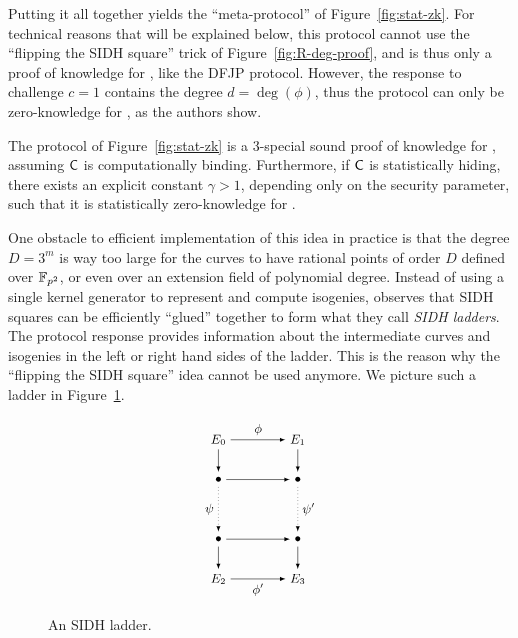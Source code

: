 Putting it all together yields the ``meta-protocol'' of
Figure~\ref{fig:stat-zk}. For technical reasons that will be explained below, this protocol cannot use the ``flipping the SIDH square''
trick of Figure~\ref{fig:R-deg-proof}, and is thus only a proof of
knowledge for \R[isog], like the DFJP protocol.  However, the response
to challenge $c=1$ contains the degree $d=\deg(\phi)$, thus the
protocol can only be zero-knowledge for \R[deg], as the authors show.

\begin{proposition}
  The protocol of Figure~\ref{fig:stat-zk} is a 3-special sound proof
  of knowledge for \R[isog], assuming $\mathsf{C}$ is computationally
  binding.  Furthermore, if $\mathsf{C}$ is statistically hiding, there
  exists an explicit constant $\gamma>1$, depending only on the
  security parameter, such that it is statistically zero-knowledge for
  \R[deg].
\end{proposition}

One obstacle to efficient implementation of this idea in practice is that the
degree $D=3^m$ is way too large for the curves to have rational points
of order $D$ defined over $\mathbb{F}_{p^2}$, or even over an extension field
of polynomial degree.  Instead of using a single kernel generator to
represent and compute isogenies, \cite{cryptoeprint:2022/1469} observes that SIDH squares
can be efficiently ``glued'' together to form what they call
\emph{SIDH ladders}.
The protocol response provides information about the intermediate curves and isogenies in the left or right hand sides of the ladder.
This is the reason why the ``flipping the SIDH square'' idea cannot be used anymore.
We picture such a ladder in Figure~\ref{fig:ladder}.

\begin{figure}
%
\begin{equation*}
  \begin{tikzpicture}
    \small
    \node (E0) at (0,0) {$E_0$};
    \node (E1) at (2,0) {$E_1$};
    \node (Ee0) at (0,-1) {$\bullet$};
    \node (Eo0) at (2,-1) {$\bullet$};
    \node (Ee1) at (0,-2.5) {$\bullet$};
    \node (Eo1) at (2,-2.5) {$\bullet$};
    \node (E2) at (0,-3.5) {$E_2$};
    \node (E3) at (2,-3.5) {$E_3$};

    \draw[-latex]
    (E0) edge node[above] {$\phi$} (E1)
    (Ee0) edge (Eo0)
    (Ee1) edge (Eo1)
    (E2) edge node[below] {$\phi'$} (E3)
    (E0) edge (Ee0)
    (E1) edge (Eo0)
    (Ee1) edge (E2)
    (Eo1) edge (E3);
    \draw[dotted,-latex]
    (Ee0) edge node[left] {$\psi$} (Ee1)
    (Eo0) edge node[right] {$\psi'$} (Eo1);
  \end{tikzpicture}
\end{equation*}
\caption{An SIDH ladder.} \label{fig:ladder}
\end{figure}

